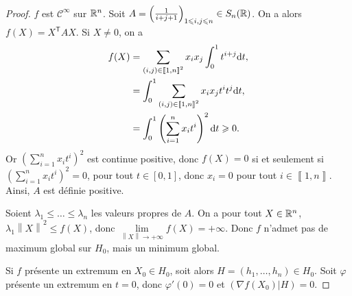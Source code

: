 \documentclass[12pt]{article}
\begin{document}
\begin{proof}
	$f$ est $\mathcal{C}^{\infty}$ sur $\mathbb{R}^{n}$. Soit $A=\left(\frac{1}{i+j+1}\right)_{1\leqslant i,j\leqslant n}\in S_n(\mathbb{R})$. On a alors $f(X)=X^{\mathsf{T}}AX$. Si $X\neq 0$, on a 
	\begin{align}
		f(X)
		&=\sum_{(i,j)\in\left\llbracket1,n\right\rrbracket^{2}}x_{i}x_{j}\int_{0}^{1}t^{i+j}\mathrm{d} t,\\
		&=\int_{0}^{1}\sum_{(i,j)\in\left\llbracket1,n\right\rrbracket^{2}}x_i x_j t^{i}t^{j}\mathrm{d} t,\\
		&=\int_{0}^{1}\left(\sum_{i=1}^{n}x_i t^{i}\right)^{2}\mathrm{d} t\geqslant0.
	\end{align}
	Or $\left(\sum_{i=1}^{n}x_i t^{i}\right)^{2}$ est continue positive, donc $f(X)=0$ si et seulement si $\left(\sum_{i=1}^{n}x_i t^{i}\right)^{2}=0$, pour tout $t\in[0,1]$, donc $x_i=0$ pour tout $i\in\left\llbracket1,n\right\rrbracket$. Ainsi, $A$ est définie positive.

	Soient $\lambda_1\leqslant\dots\leqslant\lambda_n$ les valeurs propres de $A$. On a pour tout $X\in\mathbb{R}^{n}$, $\lambda_1\left\lVert X\right\rVert^{2}\leqslant f(X)$, donc $\lim\limits_{\left\lVert X\right\rVert\to+\infty}f(X)=+\infty$. Donc $f$ n'admet pas de maximum global sur $H_0$, mais un minimum global.

	Si $f$ présente un extremum en $X_0\in H_0$, soit alors $H=(h_1,\dots,h_n)\in H_0$. Soit 
	$\varphi$ présente un extremum en $t=0$, donc $\varphi'(0)=0$ et $(\nabla f(X_0)| H)=0$.


\end{proof}
\end{document}
